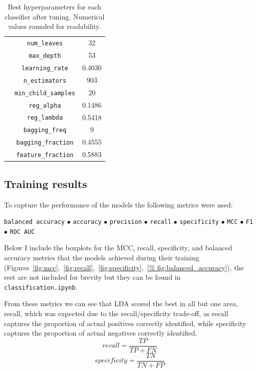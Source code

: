 \documentclass[12pt]{article}
\begin{document}
\begin{table}[H]
\begin{tabular}{|c|c|c|}
      & \texttt{num\_leaves} & 32 \\
      & \texttt{max\_depth} & 53 \\
      & \texttt{learning\_rate} & 0.4030 \\
      & \texttt{n\_estimators} & 903 \\
      & \texttt{min\_child\_samples} & 20 \\
      & \texttt{reg\_alpha} & 0.1486 \\
      & \texttt{reg\_lambda} & 0.5418 \\
      & \texttt{bagging\_freq} & 9 \\
      & \texttt{bagging\_fraction} & 0.4555 \\
      & \texttt{feature\_fraction} & 0.5883 \\
    \hline
    \end{tabular}
    \caption{Best hyperparameters for each classifier after tuning. Numerical
    values rounded for readability.}
    \label{tab:hyperparams_models}
\end{table}


\subsection{Training results}

To capture the performance of the models the following metrics were used:
\begin{center}
    \texttt{balanced accuracy}
    $\bullet$
    \texttt{accuracy}
    $\bullet$
    \texttt{precision}
    $\bullet$
    \texttt{recall}
    $\bullet$
    \texttt{specificity}
    $\bullet$
    \texttt{MCC}
    $\bullet$
    \texttt{F1}
    $\bullet$
    \texttt{ROC AUC}
\end{center}

Below I include the boxplots for the MCC, recall, specificity, and balanced
accuracy metrics that the models achieved during their training
(Figures~\ref{fig:mcc},~\ref{fig:recall},~\ref{fig:specificity},~\ref{%
fig:balanced_accuracy}), the rest are not included for brevity but they can be
found in \texttt{classification.ipynb}.

From these metrics we can see that LDA scored the best in all but one area,
recall, which was expected due to the recall/specificity trade-off, as
recall captures the proportion of actual positives correctly identified, while
specificity captures the proportion of actual negatives correctly identified.
\[
recall = \frac{TP}{TP + FN}
\]
\[
specificity = \frac{TN}{TN + FP}
\]
\end{document}
